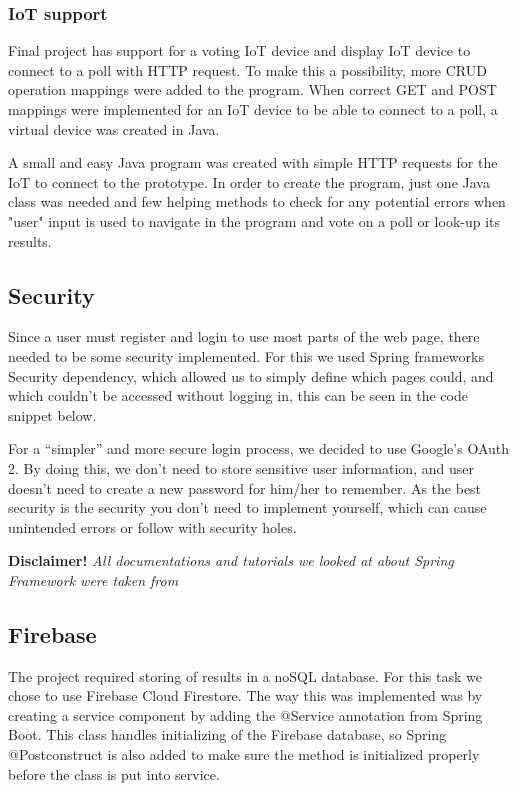 \subsubsection{IoT support}\label{subsub:IoTsupport}
Final project has support for a voting IoT device and display IoT device to connect to a poll with HTTP request. To make this a possibility, more CRUD operation mappings were added to the program. When correct GET and POST mappings were implemented for an IoT device to be able to connect to a poll, a virtual device was created in Java.

A small and easy Java program was created with simple HTTP requests for the IoT to connect to the prototype. In order to create the program, just one Java class was needed and few helping methods to check for any potential errors when "user" input is used to navigate in the program and vote on a poll or look-up its results.

\subsection{Security}\label{sub:security}
Since a user must register and login to use most parts of the web page, there needed to be some security implemented. For this we used Spring frameworks Security dependency, which allowed us to simply define which pages could, and which couldn't be accessed without logging in, this can be seen in the code snippet below.

For a “simpler” and more secure login process, we decided to use Google's OAuth 2. By doing this, we don't need to store sensitive user information, and user doesn't need to create a new password for him/her to remember. As the best security is the security you don't need to implement yourself, which can cause unintended errors or follow with security holes.



{\footnotesize\textbf{Disclaimer!}\textit{ All documentations and tutorials we looked at about Spring Framework were taken from \cite{spring_Framework}}}

\subsection{Firebase}\label{sub:firebaseimplement}
The project required storing of results in a noSQL database. For this task we chose to use Firebase Cloud Firestore. The way this was implemented was by creating a service component by adding the @Service annotation from Spring Boot. This class handles initializing of the Firebase database, so Spring @Postconstruct is also added to make sure the method is initialized properly before the class is put into service.

